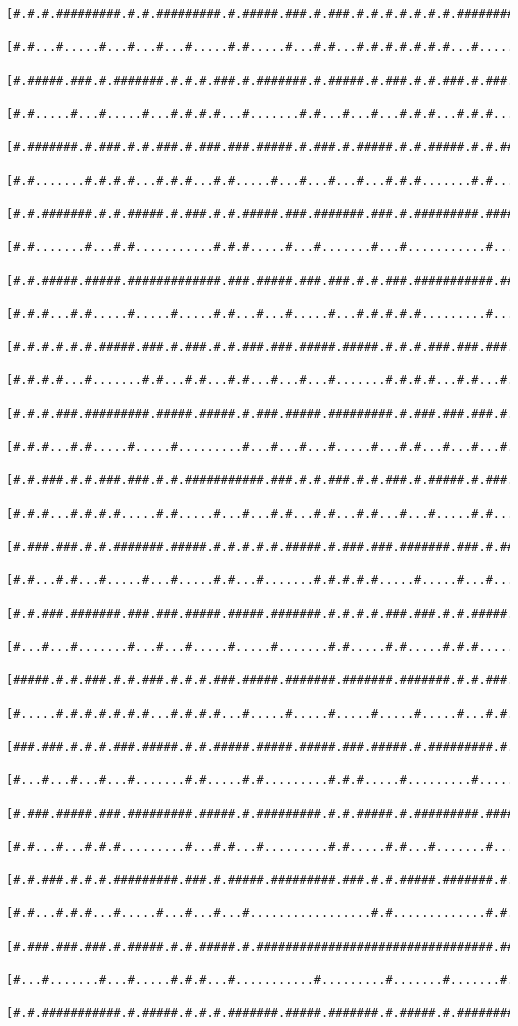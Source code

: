 \documentclass[a4paper,10pt,ngerman]{scrartcl}
\begin{document}
\begin{lstlisting}[frame=tb]
 [#.#.#.#########.#.#.#########.#.#####.###.#.###.#.#.#.#.#.#.#.###########.#.###.#]
 [#.#...#.....#...#...#...#.....#.#.....#...#.#...#.#.#.#.#.#.#...#.....#...#.....#]
 [#.#####.###.#.#######.#.#.#.###.#.#######.#.#####.#.###.#.#.###.#.###.#.#########]
 [#.#.....#...#.....#...#.#.#.#...#.......#.#...#...#...#.#.#...#.#.#...#...#.....#]
 [#.#######.#.###.#.#.###.#.###.###.#####.#.###.#.#####.#.#.#####.#.#.#######.###.#]
 [#.#.......#.#.#.#...#.#.#...#.#.....#...#...#...#...#.#.#.......#.#.........#...#]
 [#.#.#######.#.#.#####.#.###.#.#.#####.###.#######.###.#.#########.###########.#.#]
 [#.#.......#...#.#...........#.#.#.....#...#.......#...#...........#.......#...#.#]
 [#.#.#####.#####.#############.###.#####.###.###.#.#.###.###########.#######.#####]
 [#.#.#...#.#.....#.....#.....#.#...#...#.....#...#.#.#.#.#.........#...#.....#...#]
 [#.#.#.#.#.#.#####.###.#.###.#.#.###.###.#####.#####.#.#.#.###.###.###.#.#####.#.#]
 [#.#.#.#...#.......#.#...#.#...#.#...#...#...#.......#.#.#.#...#.#...#.#.......#.#]
 [#.#.#.###.#########.#####.#####.#.###.#####.#########.#.###.###.###.#.#########.#]
 [#.#.#...#.#.....#.....#.........#...#...#...#.....#...#.#...#...#...#...#.#...#.#]
 [#.#.###.#.#.###.###.#.#.###########.###.#.#.###.#.#.###.#.#####.#.###.#.#.#.#.#.#]
 [#.#.#...#.#.#.#.....#.#.....#...#...#.#...#.#...#.#...#...#.....#.#...#...#.#.#.#]
 [#.###.###.#.#.#######.#####.#.#.#.#.#.#####.#.###.###.#######.###.#.###.###.#.#.#]
 [#.#...#.#...#.....#...#.....#.#...#.......#.#.#.#.#.....#.....#...#...#.#...#...#]
 [#.#.###.#######.###.###.#####.#####.#######.#.#.#.#.###.###.#.#.#####.###.#.#####]
 [#...#...#.......#...#...#.....#.....#.......#.#.....#.#.....#.#.#.....#...#.#...#]
 [#####.#.#.###.#.#.###.#.#.#.###.#####.#######.#######.#######.#.#.###.#.#####.#.#]
 [#.....#.#.#.#.#.#.#...#.#.#.#...#.....#.....#.....#.....#.....#...#.#.#.....#.#.#]
 [###.###.#.#.#.###.#####.#.#.#####.#####.#####.###.#####.#.#########.#.#####.#.#.#]
 [#...#...#...#...#.......#.#.....#.#.........#.#.#.....#.........#.........#...#.#]
 [#.###.#####.###.#########.#####.#.#########.#.#.#####.#.#########.#####.#####.#.#]
 [#.#...#...#.#.#.........#...#.#...#.........#.#.....#.#...#.......#...#.#...#.#.#]
 [#.#.###.#.#.#.#########.###.#.#####.#########.###.#.#.#####.#######.#.###.#.###.#]
 [#.#...#.#.#...#.....#...#...#...#.................#.#.............#.#.....#.#...#]
 [#.###.###.###.#.#####.#.#.#####.#.#################################.#######.#.#.#]
 [#...#.......#...#.....#.#.#...#...........#.........#.......#.......#.........#.#]
 [#.#.###########.#.#####.#.#.#.#######.#####.#######.#.#####.#.###################]

\end{lstlisting}
\end{document}
